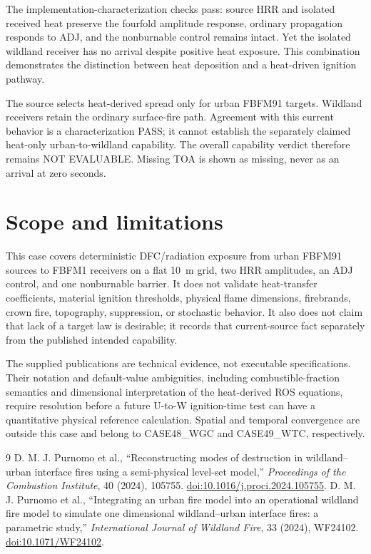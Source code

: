The implementation-characterization checks pass: source HRR and isolated
received heat preserve the fourfold amplitude response, ordinary propagation
responds to ADJ, and the nonburnable control remains intact. Yet the isolated
wildland receiver has no arrival despite positive heat exposure. This
combination demonstrates the distinction between heat deposition and a
heat-driven ignition pathway.

The source selects heat-derived spread only for urban FBFM91 targets. Wildland
receivers retain the ordinary surface-fire path. Agreement with this current
behavior is a characterization PASS; it cannot establish the separately
claimed heat-only urban-to-wildland capability. The overall capability verdict
therefore remains NOT EVALUABLE. Missing TOA is shown as missing, never as an
arrival at zero seconds.

\section{Scope and limitations}
This case covers deterministic DFC/radiation exposure from urban FBFM91
sources to FBFM1 receivers on a flat \SI{10}{m} grid, two HRR amplitudes, an
ADJ control, and one nonburnable barrier.  It does not validate heat-transfer
coefficients, material ignition thresholds, physical flame dimensions,
firebrands, crown fire, topography, suppression, or stochastic behavior.  It
also does not claim that lack of a target law is desirable; it records that
current-source fact separately from the published intended capability.

The supplied publications are technical evidence, not executable
specifications.  Their notation and default-value ambiguities, including
combustible-fraction semantics and dimensional interpretation of the
heat-derived ROS equations, require resolution before a future U-to-W
ignition-time test can have a quantitative physical reference calculation.  Spatial and
temporal convergence are outside this case and belong to CASE48\_WGC and
CASE49\_WTC, respectively.

\begin{thebibliography}{9}
 D. M. J. Purnomo et al., ``Reconstructing modes of destruction in wildland--urban interface fires using a semi-physical level-set model,'' \emph{Proceedings of the Combustion Institute}, 40 (2024), 105755. \href{https://doi.org/10.1016/j.proci.2024.105755}{doi:10.1016/j.proci.2024.105755}.
 D. M. J. Purnomo et al., ``Integrating an urban fire model into an operational wildland fire model to simulate one dimensional wildland--urban interface fires: a parametric study,'' \emph{International Journal of Wildland Fire}, 33 (2024), WF24102. \href{https://doi.org/10.1071/WF24102}{doi:10.1071/WF24102}.
\end{thebibliography}
